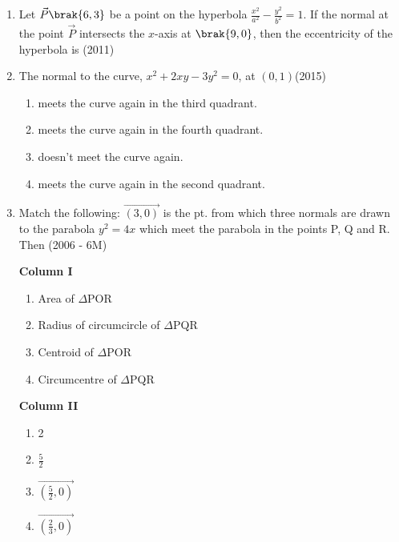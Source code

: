 \begin{enumerate}
\item Let $\vec{P}\brak{6,3}$ be a point on the hyperbola $\frac{x^2}{a^2}-\frac{y^2}{b^2}=1$. If the normal at the point $\vec{P}$ intersects the $x$-axis at $\brak{9,0}$, then the eccentricity of the hyperbola is 
	\hfill (2011)
		\begin{multicols}{2}
\begin{enumerate}
		\end{enumerate}
\end{multicols}
\item The normal to the curve, $x^2+2xy-3y^2=0$, at $(0,1)$\hfill(2015)
\begin{multicols}{2}
\begin{enumerate}
    \item meets the curve again in the third quadrant.
    \item meets the curve again in the fourth quadrant.
    \item doesn't meet the curve again.
    \item meets the curve again in the second quadrant.
\end{enumerate}
\end{multicols}
	\item   Match the following: $\vec{(3,0)}$ is the pt. from which three normals are drawn to the parabola $y^2 = 4x$ which meet the parabola in the points P, Q and R. Then \hfill{(2006 - 6M)}
\begin{multicols}{2}
\textbf{Column I}
\begin{multicols}{2}
\begin{enumerate}
    \item Area of $\Delta$POR 
    \item Radius of circumcircle of $\Delta$PQR
    \item Centroid of $\Delta$POR 
    \item  Circumcentre of $\Delta$PQR 
\end{enumerate}
\end{multicols} 

\textbf{Column II}
\begin{multicols}{2}
\begin{enumerate}
    \item 2
    \item $\frac{5}{2}$
    \item $\vec{(\frac{5}{2},0)}$
    \item $\vec{(\frac{2}{3},0)}$
\end{enumerate}
\end{multicols}
\end{multicols}


\end{enumerate}
